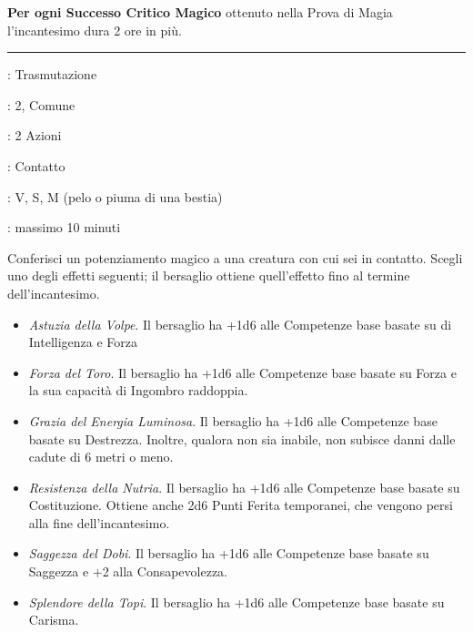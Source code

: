 \begin{multicols}{2}
\textbf{Per ogni Successo Critico Magico} ottenuto nella Prova di Magia l'incantesimo dura 2 ore in più.

\smallskip\noindent\rule{\linewidth}{2pt} \hypertarget{Caratteristica Potenziata}{}\medskip{}
\noindent
\begin{description}[noitemsep, topsep=0pt, parsep=0pt, partopsep=0pt, leftmargin=0cm, labelwidth=2.8cm]
	\item[\textbf{Lista di Magia}]: Trasmutazione
	\item[\textbf{Livello}]: 2, Comune
	\item[\textbf{T. di Lancio}]: 2 Azioni
	\item[\textbf{Gittata}]: Contatto
	\item[\textbf{Componenti}]: V, S, M (pelo o piuma di una bestia)
	\item[\textbf{Durata}]: massimo 10 minuti
\end{description}

Conferisci un potenziamento magico a una creatura con cui sei in contatto. Scegli uno degli effetti seguenti; il bersaglio ottiene quell'effetto fino al termine dell'incantesimo.

\begin{itemize}[leftmargin=*] \setlength{\itemsep}{0pt}
	\item \emph{Astuzia della Volpe}. Il bersaglio ha +1d6 alle Competenze base basate su di Intelligenza e Forza
	\item \emph{Forza del Toro}. Il bersaglio ha +1d6 alle Competenze base basate su Forza e la sua capacità di Ingombro raddoppia.
	\item \emph{Grazia del Energia Luminosa}. Il bersaglio ha +1d6 alle Competenze base basate su Destrezza. Inoltre, qualora non sia inabile, non subisce danni dalle cadute di 6 metri o meno.
	\item \emph{Resistenza della Nutria}. Il bersaglio ha +1d6 alle Competenze base basate su  Costituzione. Ottiene anche 2d6 Punti Ferita temporanei, che vengono persi alla fine dell'incantesimo.
	\item \emph{Saggezza del Dobi}. Il bersaglio ha +1d6 alle Competenze base basate su  Saggezza e +2 alla Consapevolezza.
	\item \emph{Splendore della Topi}. Il bersaglio ha +1d6 alle Competenze base basate su  Carisma.
\end{itemize}


\end{multicols}
